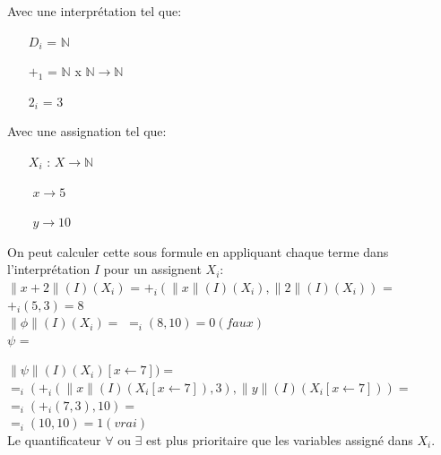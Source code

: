 Avec une interprétation tel que:
\begin{itemize}
\item[$D_i$] = $\mathbb{N}$
\item[$+_1$] = $\mathbb{N}$ x $\mathbb{N} \rightarrow \mathbb{N}$
\item[$2_i$] = $3$
\end{itemize}

Avec une assignation tel que:
\begin{itemize}
\item[$X_i$]: $X \rightarrow \mathbb{N}$
\item[$ $] $x \rightarrow 5$
\item[$ $] $y \rightarrow 10$
\end{itemize}
\pagebreak
On peut calculer cette sous formule en appliquant chaque terme dans l'interprétation $I$ pour un assignent $X_i$:\\
$\| x + 2 \| (I)(X_i)$ = $+_i ( \| x \| (I)(X_i), \| 2 \| (I) (X_i))$ = $+_i (5,3) = 8$\\
$\| \phi \| (I)(X_i) =$ $ =_i(8,10) = 0 (faux)$\\


$\psi$ = \\

$\| \psi \| (I)(X_i)[x \leftarrow 7]) =$\\
$ =_i ( +_i (\| x\| (I)(X_i [x \leftarrow 7 ]), 3), \| y \| (I)(X_i[x \leftarrow 7])) = $\\
$ =_i ( +_i (7,3), 10) = $\\
$ =_i (10,10) = 1(vrai)$\\

Le quantificateur $\forall$ ou $\exists$ est plus prioritaire que les variables assigné dans $X_i$.\\

